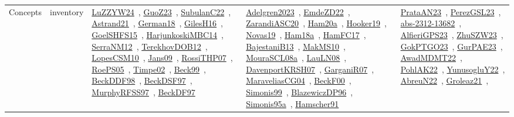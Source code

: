 {\begin{longtable}{lp{3cm}>{\raggedright\arraybackslash}p{6cm}>{\raggedright\arraybackslash}p{6cm}>{\raggedright\arraybackslash}p{8cm}}
Concepts & inventory & \href{../works/LuZZYW24.pdf}{LuZZYW24}~\cite{LuZZYW24}, \href{../works/GuoZ23.pdf}{GuoZ23}~\cite{GuoZ23}, \href{../works/SubulanC22.pdf}{SubulanC22}~\cite{SubulanC22}, \href{../works/Astrand21.pdf}{Astrand21}~\cite{Astrand21}, \href{../works/German18.pdf}{German18}~\cite{German18}, \href{../works/GilesH16.pdf}{GilesH16}~\cite{GilesH16}, \href{../works/GoelSHFS15.pdf}{GoelSHFS15}~\cite{GoelSHFS15}, \href{../works/HarjunkoskiMBC14.pdf}{HarjunkoskiMBC14}~\cite{HarjunkoskiMBC14}, \href{../works/SerraNM12.pdf}{SerraNM12}~\cite{SerraNM12}, \href{../works/TerekhovDOB12.pdf}{TerekhovDOB12}~\cite{TerekhovDOB12}, \href{../works/LopesCSM10.pdf}{LopesCSM10}~\cite{LopesCSM10}, \href{../works/Jans09.pdf}{Jans09}~\cite{Jans09}, \href{../works/RossiTHP07.pdf}{RossiTHP07}~\cite{RossiTHP07}, \href{../works/RoePS05.pdf}{RoePS05}~\cite{RoePS05}, \href{../works/Timpe02.pdf}{Timpe02}~\cite{Timpe02}, \href{../works/Beck99.pdf}{Beck99}~\cite{Beck99}, \href{../works/BeckDDF98.pdf}{BeckDDF98}~\cite{BeckDDF98}, \href{../works/BeckDSF97.pdf}{BeckDSF97}~\cite{BeckDSF97}, \href{../works/MurphyRFSS97.pdf}{MurphyRFSS97}~\cite{MurphyRFSS97}, \href{../works/BeckDF97.pdf}{BeckDF97}~\cite{BeckDF97} & \href{../works/Adelgren2023.pdf}{Adelgren2023}~\cite{Adelgren2023}, \href{../works/EmdeZD22.pdf}{EmdeZD22}~\cite{EmdeZD22}, \href{../works/ZarandiASC20.pdf}{ZarandiASC20}~\cite{ZarandiASC20}, \href{../works/Ham20a.pdf}{Ham20a}~\cite{Ham20a}, \href{../works/Hooker19.pdf}{Hooker19}~\cite{Hooker19}, \href{../works/Novas19.pdf}{Novas19}~\cite{Novas19}, \href{../works/Ham18a.pdf}{Ham18a}~\cite{Ham18a}, \href{../works/HamFC17.pdf}{HamFC17}~\cite{HamFC17}, \href{../works/BajestaniB13.pdf}{BajestaniB13}~\cite{BajestaniB13}, \href{../works/MakMS10.pdf}{MakMS10}~\cite{MakMS10}, \href{../works/MouraSCL08a.pdf}{MouraSCL08a}~\cite{MouraSCL08a}, \href{../works/LauLN08.pdf}{LauLN08}~\cite{LauLN08}, \href{../works/DavenportKRSH07.pdf}{DavenportKRSH07}~\cite{DavenportKRSH07}, \href{../works/GarganiR07.pdf}{GarganiR07}~\cite{GarganiR07}, \href{../works/MaraveliasCG04.pdf}{MaraveliasCG04}~\cite{MaraveliasCG04}, \href{../works/BeckF00.pdf}{BeckF00}~\cite{BeckF00}, \href{../works/Simonis99.pdf}{Simonis99}~\cite{Simonis99}, \href{../works/BlazewiczDP96.pdf}{BlazewiczDP96}~\cite{BlazewiczDP96}, \href{../works/Simonis95a.pdf}{Simonis95a}~\cite{Simonis95a}, \href{../works/Hamscher91.pdf}{Hamscher91}~\cite{Hamscher91} & \href{../works/PrataAN23.pdf}{PrataAN23}~\cite{PrataAN23}, \href{../works/PerezGSL23.pdf}{PerezGSL23}~\cite{PerezGSL23}, \href{../works/abs-2312-13682.pdf}{abs-2312-13682}~\cite{abs-2312-13682}, \href{../works/AlfieriGPS23.pdf}{AlfieriGPS23}~\cite{AlfieriGPS23}, \href{../works/ZhuSZW23.pdf}{ZhuSZW23}~\cite{ZhuSZW23}, \href{../works/GokPTGO23.pdf}{GokPTGO23}~\cite{GokPTGO23}, \href{../works/GurPAE23.pdf}{GurPAE23}~\cite{GurPAE23}, \href{../works/AwadMDMT22.pdf}{AwadMDMT22}~\cite{AwadMDMT22}, \href{../works/PohlAK22.pdf}{PohlAK22}~\cite{PohlAK22}, \href{../works/YunusogluY22.pdf}{YunusogluY22}~\cite{YunusogluY22}, \href{../works/AbreuN22.pdf}{AbreuN22}~\cite{AbreuN22}, \href{../works/Groleaz21.pdf}{Groleaz21}~\cite{Groleaz21}, 
\end{longtable}}
